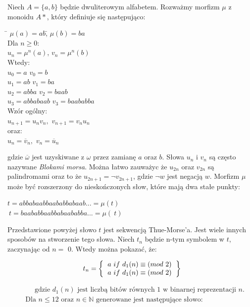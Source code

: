 \documentclass[document]{xmgr}
\begin{document}
Niech $A = \{a, b\}$ będzie dwuliterowym alfabetem. Rozważmy morfizm $\mu$ z monoidu $A*$, który definiuje się następująco:



\begin{tabbing}

\hspace{8em}\= $\mu(a) = ab$,\hspace{7em}\= $\mu(b) = ba$\\
Dla $n \geq 0$:\\
\> $u_n = \mu^n(a)$,\> $v_n = \mu^n(b)$\\
Wtedy:\\
\> $u_0 = a$ \> $v_0 = b$\\
\> $u_1 = ab$ \> $v_1 = ba$\\
\> $u_2 = abba$	 \> $v_2 = baab$\\
\> $u_3 = abbabaab$ \> $v_3 = baababba$\\
Wzór ogólny:\\
\> $u_{n+1} = u_n v_n,$ \> $v_{n+1} = v_n u_n$\\
oraz:\\
\> $u_n = \overline{v}_n,$ \> $v_n = \overline{u}_n$
\end{tabbing}

gdzie $\overline{\omega}$ jest uzyskiwane z $\omega$ przez zamianę $a$ oraz $b$. Słowa $u_n$ i $v_n$ są często nazywane \textit{Blokami morsa}. Można łatwo zauważyc że $u_{2n}$ oraz $v_{2n}$ są palindromami oraz to że $u_{2n+1} = \neg v_{2n+1}$, gdzie $\neg w$ jest negacją $w$. Morfizm $\mu$ może być rozszerzony do nieskończonych słow, które mają dwa stałe punkty:


{\centering 
$t = abbabaabbaababbabaab... = \mu(t)$ \\
$~t = baababbaabbabaababba... = \mu(~t)$ 
\par}



Przedstawione powyżej słowo $t$ jest sekwencją Thue-Morse'a. Jest wiele innych sposobów na stworzenie tego słowa. Niech $t_n$ będzie n-tym symbolem w $t$, zaczynając od $n =$ 0. Wtedy można pokazać, że:

\[
t_n=
\left \{
\begin{tabular}{ccc}
$a\ if\ d_1(n) \equiv (mod\ 2)$ \\
$a\ if\ d_1(n) \equiv (mod\ 2)$
\end{tabular}
\right \}
\]

\begin{align*}
  &\phantom{{}\leq{}} \text{gdzie } d_1(n) \text{ jest liczbą bitów równych 1 w binarnej reprezentacji } n \text{.}  \\
  & \text{Dla } n \leq 12 \text{ oraz } n \in \mathbb{N} \text{ generowane jest następujące słowo:}  \\
\end{align*}
\end{document}
